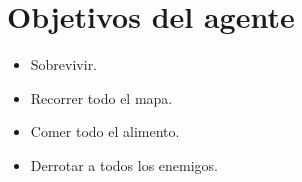 \section{Objetivos del agente}

\begin{itemize}
\item Sobrevivir.
\item Recorrer todo el mapa.
\item Comer todo el alimento.
\item Derrotar a todos los enemigos.
\end{itemize}
